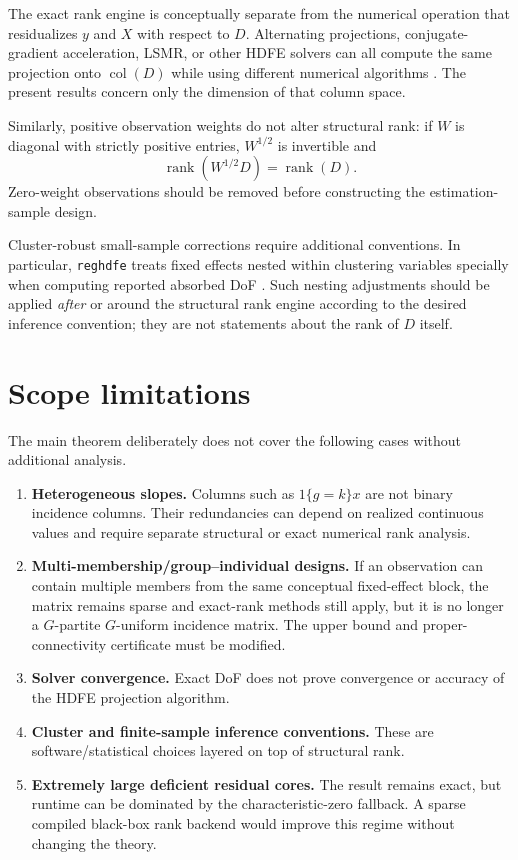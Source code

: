 \documentclass[11pt]{article}
\theoremstyle{definition}
\newcommand{\rank}{\operatorname{rank}}
\newcommand{\col}{\operatorname{col}}
\newcommand{\1}{\mathbf{1}}
\begin{document}
The exact rank engine is conceptually separate from the numerical operation that residualizes $y$ and $X$ with respect to $D$. Alternating projections, conjugate-gradient acceleration, LSMR, or other HDFE solvers can all compute the same projection onto $\col(D)$ while using different numerical algorithms \citep{GuimaraesPortugal2010,Gaure2013,Correia2017}. The present results concern only the dimension of that column space.

Similarly, positive observation weights do not alter structural rank: if $W$ is diagonal with strictly positive entries, $W^{1/2}$ is invertible and
\begin{equation}
  \rank(W^{1/2}D)=\rank(D).
\end{equation}
Zero-weight observations should be removed before constructing the estimation-sample design.

Cluster-robust small-sample corrections require additional conventions. In particular, \texttt{reghdfe} treats fixed effects nested within clustering variables specially when computing reported absorbed DoF \citep{CorreiaConstantine2026reghdfe}. Such nesting adjustments should be applied \emph{after} or around the structural rank engine according to the desired inference convention; they are not statements about the rank of $D$ itself.

\section{Scope limitations}

The main theorem deliberately does not cover the following cases without additional analysis.

\begin{enumerate}[label=(\roman*)]
  \item \textbf{Heterogeneous slopes.} Columns such as $1\{g=k\}x$ are not binary incidence columns. Their redundancies can depend on realized continuous values and require separate structural or exact numerical rank analysis.
  \item \textbf{Multi-membership/group--individual designs.} If an observation can contain multiple members from the same conceptual fixed-effect block, the matrix remains sparse and exact-rank methods still apply, but it is no longer a $G$-partite $G$-uniform incidence matrix. The upper bound and proper-connectivity certificate must be modified.
  \item \textbf{Solver convergence.} Exact DoF does not prove convergence or accuracy of the HDFE projection algorithm.
  \item \textbf{Cluster and finite-sample inference conventions.} These are software/statistical choices layered on top of structural rank.
  \item \textbf{Extremely large deficient residual cores.} The result remains exact, but runtime can be dominated by the characteristic-zero fallback. A sparse compiled black-box rank backend would improve this regime without changing the theory.
\end{enumerate}
\end{document}
